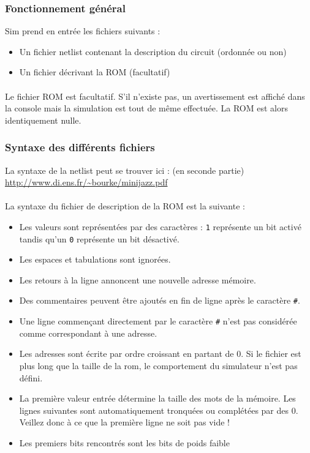 \documentclass{article}
\begin{document}
\subsubsection{Fonctionnement général}
Sim prend en entrée les fichiers suivants :
\begin{itemize}
	\item Un fichier netlist contenant la description du circuit (ordonnée ou non)
	\item Un fichier décrivant la ROM (facultatif)
\end{itemize}

\paragraph{}Le fichier ROM est facultatif. S'il n'existe pas, un avertissement est affiché dans la console mais la simulation est tout de même effectuée. La ROM est alors identiquement nulle.


\subsubsection{Syntaxe des différents fichiers}
La syntaxe de la netlist peut se trouver ici : (en seconde partie)\\
\url{http://www.di.ens.fr/~bourke/minijazz.pdf}

\paragraph{}La syntaxe du fichier de description de la ROM est la suivante :
\begin{itemize}
	\item Les valeurs sont représentées par des caractères : \texttt1 représente un bit activé tandis qu'un \texttt0 représente un bit désactivé.
	\item Les espaces et tabulations sont ignorées.
	\item Les retours à la ligne annoncent une nouvelle adresse mémoire.
	\item Des commentaires peuvent être ajoutés en fin de ligne après le caractère \texttt\#.
	\item Une ligne commençant directement par le caractère \texttt\# n'est pas considérée comme correspondant à une adresse.
	\item Les adresses sont écrite par ordre croissant en partant de 0. Si le fichier est plus long que la taille de la rom, le comportement du simulateur n'est pas défini.
	\item La première valeur entrée détermine la taille des mots de la mémoire. Les lignes suivantes sont automatiquement tronquées ou complétées par des 0. Veillez donc à ce que la première ligne ne soit pas vide !
          \item Les premiers bits rencontrés sont les bits de poids faible
\end{itemize}
\end{document}
